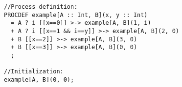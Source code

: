 \begin{lstlisting}
//Process definition:
PROCDEF example[A :: Int, B](x, y :: Int)
  = A ? i [[x==0]] >-> example[A, B](1, i)
  + A ? i [[x==1 && i==y]] >-> example[A, B](2, 0)
  + B [[x==2]] >-> example[A, B](3, 0)
  + B [[x==3]] >-> example[A, B](0, 0)
  ;

//Initialization:
example[A, B](0, 0);
\end{lstlisting}





